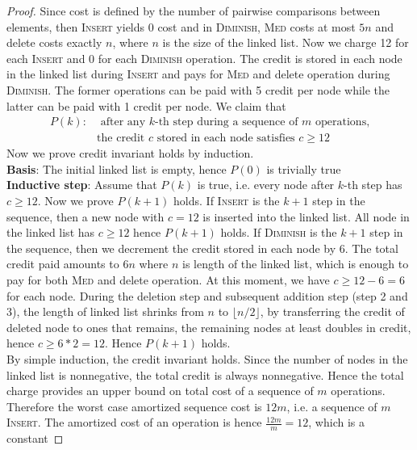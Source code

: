 \documentclass[11pt]{article}
\begin{document}
\begin{proof}
  Since cost is defined by the number of pairwise comparisons between elements, then \textsc{Insert} yields 0 cost and in \textsc{Diminish}, \textsc{Med} costs at most $5n$ and delete costs exactly $n$, where $n$ is the size of the linked list. Now we charge 12 for each \textsc{Insert} and 0 for each \textsc{Diminish} operation. The credit is stored in each node in the linked list during \textsc{Insert} and pays for \textsc{Med} and delete operation during \textsc{Diminish}. The former operations can be paid with 5 credit per node while the latter can be paid with 1 credit per node. We claim that
  \begin{align*}
    P(k): &\text{ after any $k$-th step during a sequence of $m$ operations,} \\
    &\text{the credit $c$ stored in each node satisfies $c \geq 12$}
  \end{align*}
  Now we prove credit invariant holds by induction. \\
  \textbf{Basis}: The initial linked list is empty, hence $P(0)$ is trivially true \\
  \textbf{Inductive step}: Assume that $P(k)$ is true, i.e. every node after $k$-th step has $c \geq 12$. Now we prove $P(k+1)$ holds. If \textsc{Insert} is the $k+1$ step in the sequence, then a new node with $c = 12$ is inserted into the linked list. All node in the linked list has $c\geq 12$ hence $P(k+1)$ holds. If \textsc{Diminish} is the $k+1$ step in the sequence, then we decrement the credit stored in each node by 6. The total credit paid amounts to $6n$ where $n$ is length of the linked list, which is enough to pay for both \textsc{Med} and delete operation. At this moment, we have $c \geq 12 - 6 = 6$ for each node. During the deletion step and subsequent addition step (step 2 and 3), the length of linked list shrinks from $n$ to $\lfloor n /2 \rfloor$, by transferring the credit of deleted node to ones that remains, the remaining nodes at least doubles in credit, hence $c \geq 6 * 2 = 12$. Hence $P(k+1)$ holds.\\
  By simple induction, the credit invariant holds. Since the number of nodes in the linked list is nonnegative, the total credit is always nonnegative. Hence the total charge provides an upper bound on total cost of a sequence of $m$ operations. Therefore the worst case amortized sequence cost is $12m$, i.e. a sequence of $m$ \textsc{Insert}. The amortized cost of an operation is hence $\frac{12m}{m} = 12$, which is a constant
\end{proof}
\end{document}
